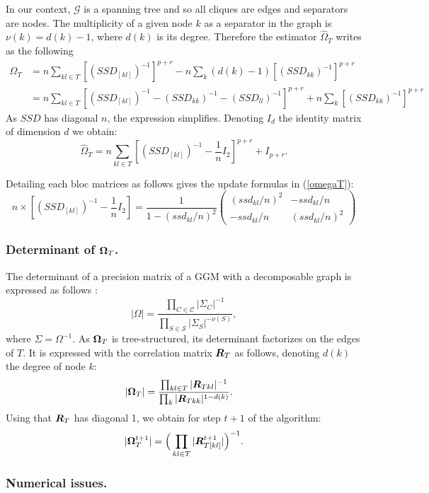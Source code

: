 In our context, $\mathcal{G}$ is a spanning tree and so all cliques are edges and separators are nodes. The multiplicity of a given node $k$ as a separator in the graph is  $\nu(k) = d(k)-1$, where $d(k)$ is its degree. Therefore the estimator  $\widehat{\Omega}_T$  writes as the following 
\begin{align*}
\widehat{\Omega}_T &= n  \sum_{kl\in T}   [(SSD_{[kl]})^{-1}]^{p+r} - n\sum_k (d(k)-1)[(SSD_{kk})^{-1}]^{p+r}\\
&=n \sum_{kl\in T}  [(SSD_{[kl]})^{-1} - (SSD_{kk})^{-1} -  (SSD_{ll})^{-1} ]^{p+r} + n\sum_k[(SSD_{kk})^{-1}]^{p+r}
\end{align*}
As $SSD$ has diagonal $n$, the expression simplifies. Denoting $I_d$ the identity matrix of dimension $d$ we obtain:
$$\widehat{\Omega}_T =n\sum_{kl\in T} [(SSD_{[kl]})^{-1} -\frac{1}{n} I_2]^{p+r}+ I_{p+r}.$$

Detailing each bloc matrices as follows gives the update formulas in (\ref{omegaT}):
\[
n\times [(SSD_{[kl]})^{-1} - \frac{1}{n}I_2] = \frac{1}{1-(ssd_{kl}/n)^2}
\left(\begin{array}{cc}
		(ssd_{kl}/n)^2   & -ssd_{kl}/n\\
		-ssd_{kl}/n& (ssd_{kl}/n)^2 
		\end{array}\right)
\]


\subsubsection[for the toc]{Determinant of ${\boldsymbol{\Omega}}_T$.}
The determinant of a precision matrix of a GGM with a decomposable graph is expressed as follows \citep{Lau96}:
$$ |\Omega| =\dfrac{\prod_{C\in \mathcal{C}} |\Sigma_C|^{-1}}{\prod_{S\in \mathcal{S}} |\Sigma_S|^{-\nu(S)}},$$
where $\Sigma = \Omega^{-1}$. As ${\boldsymbol{\Omega}}_T$ is tree-structured, its determinant factorizes on the edges of $T$. It is expressed with the correlation matrix ${\boldsymbol{R}}_T$ as follows, denoting $d(k)$ the degree of node $k$:
\begin{align*}
|{{\boldsymbol{\Omega}}}_T| &=\frac{\prod_{kl \in T} |{{\boldsymbol{R}}}_{Tkl}|^{-1}}{\prod_k |{{\boldsymbol{R}}}_{Tkk}|^{1-d(k)}}.
 \end{align*}
Using that ${\boldsymbol{R}}_T$ has diagonal 1, we obtain for step $t+1$ of the algorithm:
$$|{\boldsymbol{\Omega}}^{t+1}_{T}| = \Big(\prod_{kl \in T} |{\boldsymbol{R}}_{T[kl]}^{t+1}|\Big)^{-1}.$$


\subsubsection{Numerical issues.} \label{app:numIssues}

